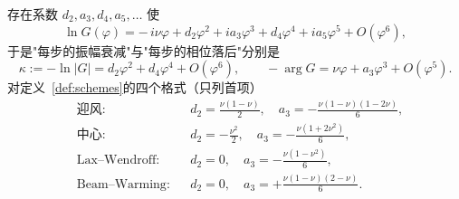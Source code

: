 \begin{theorem}[$\ln G$ 的展开]
\label{thm:modeq}
存在系数 $d_2,a_3,d_4,a_5,\dots$ 使
\begin{equation}
  \ln G(\varphi)=-\,i\nu\varphi+d_2\varphi^2+i a_3\varphi^3+d_4\varphi^4+i a_5\varphi^5+O(\varphi^6),
  \label{eq:lnG}
\end{equation}
于是"每步的振幅衰减"与"每步的相位落后"分别是
\begin{equation}
  \kappa:=-\ln|G|=d_2\varphi^2+d_4\varphi^4+O(\varphi^6),\qquad
  -\arg G=\nu\varphi+a_3\varphi^3+O(\varphi^5).
  \label{eq:kappa}
\end{equation}
对定义~\ref{def:schemes}的四个格式（只列首项）
\begin{equation}
  \begin{aligned}
    &\text{迎风}: && d_2=\tfrac{\nu(1-\nu)}{2},\quad a_3=-\tfrac{\nu(1-\nu)(1-2\nu)}{6},\\
    &\text{中心}: && d_2=-\tfrac{\nu^2}{2},\quad a_3=-\tfrac{\nu(1+2\nu^2)}{6},\\
    &\text{Lax--Wendroff}: && d_2=0,\quad a_3=-\tfrac{\nu(1-\nu^2)}{6},\\
    &\text{Beam--Warming}: && d_2=0,\quad a_3=+\tfrac{\nu(1-\nu)(2-\nu)}{6}.
  \end{aligned}
  \label{eq:coeffs}
\end{equation}
\end{theorem}

